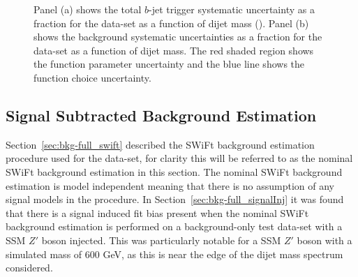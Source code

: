 \begin{figure}[!ht]
  \begin{center}
    \captionsetup[subfigure]{aboveskip=0pt,justification=centering}
  \end{center}
  \vspace{-1mm}
  \caption[The $b$-jet trigger and background systematic uncertainties for the \lm{} data-set as a function of dijet mass (\mjj)]
    {Panel (a) shows the total $b$-jet trigger systematic uncertainty as a fraction for the \lm{} data-set as a function of dijet mass (\mjj).
    Panel (b) shows the background systematic uncertainties as a fraction for the \lm{} data-set as a function of dijet mass.
    The red shaded region shows the function parameter uncertainty and the blue line shows the function choice uncertainty.}
  \label{fig:lim-lowmass_syst}
\end{figure}

\subsection{Signal Subtracted Background Estimation}
\label{sec:lim-full_ssb}

Section~\ref{sec:bkg-full_swift} described the SWiFt background estimation procedure used for the \lm{} data-set,
for clarity this will be referred to as the nominal SWiFt background estimation in this section.
The nominal SWiFt background estimation is model independent meaning that there is no assumption of any signal models in the procedure.
In Section~\ref{sec:bkg-full_signalInj} it was found that there is a signal induced fit bias present when
the nominal SWiFt background estimation is performed on a background-only test data-set with a SSM $Z'$ boson injected.
This was particularly notable for a SSM $Z'$ boson with a simulated mass of 600 GeV,
as this is near the edge of the dijet mass spectrum considered.


